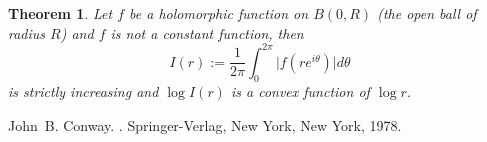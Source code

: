 \documentclass[12pt]{article}
\theoremstyle{theorem}
\newtheorem*{thm}{Theorem}
\theoremstyle{definition}
\begin{document}
\begin{thm}
Let $f$ be a holomorphic function on $B(0,R)$ (the open ball of radius $R$)
and $f$ is not a constant function, then
\begin{equation*}
I(r) := \frac{1}{2\pi} \int_0^{2\pi} \lvert f(r e^{i\theta}) \rvert d\theta
\end{equation*}
is strictly increasing and $\log I(r)$
is a convex function of $\log r$.
\end{thm}

\begin{thebibliography}{9}
John~B. Conway.
{\em {}}.
Springer-Verlag, New York, New York, 1978.
\end{thebibliography}
\end{document}
